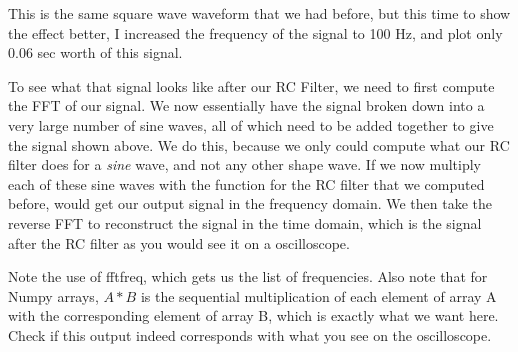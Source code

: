 \documentclass[11pt]{article}
\begin{document}
    This is the same square wave waveform that we had before, but this time
to show the effect better, I increased the frequency of the signal to
100 Hz, and plot only 0.06 sec worth of this signal.

To see what that signal looks like after our RC Filter, we need to first
compute the FFT of our signal. We now essentially have the signal broken
down into a very large number of sine waves, all of which need to be
added together to give the signal shown above. We do this, because we
only could compute what our RC filter does for a \emph{sine} wave, and
not any other shape wave. If we now multiply each of these sine waves
with the function for the RC filter that we computed before, would get
our output signal in the frequency domain. We then take the reverse FFT
to reconstruct the signal in the time domain, which is the signal after
the RC filter as you would see it on a oscilloscope.

Note the use of fftfreq, which gets us the list of frequencies. Also
note that for Numpy arrays, \(A*B\) is the sequential multiplication of
each element of array A with the corresponding element of array B, which
is exactly what we want here. Check if this output indeed corresponds
with what you see on the oscilloscope.
\end{document}
